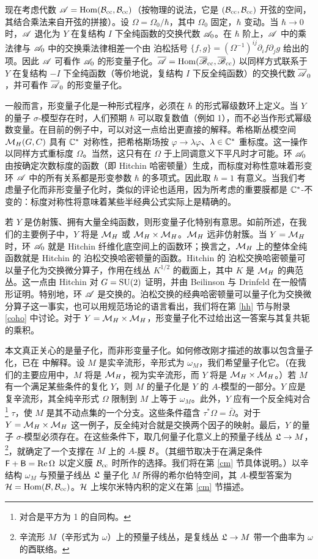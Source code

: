 现在考虑代数 ${\mathscr A}={\mathrm{Hom}}({\mathcal B}_{\mathrm{cc}},{\mathcal B}_{\mathrm{cc}})$（按物理的说法，它是 $({\mathcal B}_{\mathrm{cc}},{\mathcal B}_{\mathrm{cc}})$ 开弦的空间，其结合乘法来自开弦的拼接）。设 $\Omega=\Omega_0/\hbar$，其中 $\Omega_0$ 固定，$\hbar$ 变动。当 $\hbar\to 0$ 时，${\mathscr A}$ 退化为 $Y$ 在复结构 $I$ 下全纯函数的交换代数 ${\mathscr A}_0$。在 $\hbar$ 阶上，${\mathscr A}$ 中的乘法律与 ${\mathscr A}_0$ 中的交换乘法律相差一个由 泊松括号 $\{f,g\}=(\Omega^{-1})^{ij}\partial_i f\partial_j g$ 给出的项。因此 ${\mathscr A}$ 可看作 ${\mathscr A}_0$ 的形变量子化。$\overline{\mathscr A}={\mathrm{Hom}}({\overline {\mathscr B}}_{\mathrm{cc}},{\overline {\mathscr B}}_{\mathrm{cc}})$ 以同样方式联系于 $Y$ 在复结构 $-I$ 下全纯函数（等价地说，复结构 $I$ 下反全纯函数）的交换代数 $\overline{\mathscr A}_0$，并可看作 $\overline{\mathscr A}_0$ 的形变量子化。

一般而言，形变量子化是一种形式程序，必须在 $\hbar$ 的形式幂级数环上定义。当 $Y$ 的量子 $\sigma$-模型存在时，人们预期 $\hbar$ 可以取复数值（例如 1），而不必当作形式幂级数变量。在目前的例子中，可以对这一点给出更直接的解释。希格斯丛模空间 ${\mathcal M}_H(G,C)$ 具有 ${\mathbb C}^*$ 对称性，把希格斯场按 $\varphi\to \lambda\varphi$、$\lambda\in {\mathbb C}^*$ 重标度。这一操作以同样方式重标度 $\Omega$。当然，这只有在 $\Omega$ 于上同调意义下平凡时才可能。环 ${\mathscr A}_0$ 由按确定次数标度的函数（即 Hitchin 哈密顿量）生成，而标度对称性意味着形变环 ${\mathscr A}$ 中的所有关系都是形变参数 $\hbar$ 的多项式。因此取 $\hbar=1$ 有意义。当我们考虑量子化而非形变量子化时，类似的评论也适用，因为所考虑的重要膜都是 ${\mathbb C}^*$-不变的：标度对称性将意味着某些半经典公式实际上是精确的。

若 $Y$ 是仿射簇、拥有大量全纯函数，则形变量子化特别有意思。如前所述，在我们的主要例子中，$Y$ 将是 ${\mathcal M}_H$ 或 ${\mathcal M}_H\times {\mathcal M}_H$。${\mathcal M}_H$ 远非仿射簇。当 $Y={\mathcal M}_H$ 时，环 ${\mathscr A}_0$ 就是 Hitchin 纤维化底空间上的函数环；换言之，${\mathcal M}_H$ 上的整体全纯函数就是 Hitchin 的 泊松交换哈密顿量的函数。Hitchin 的 泊松交换哈密顿量可以量子化为交换微分算子，作用在线丛 $K^{1/2}$ 的截面上，其中 $K$ 是 ${\mathcal M}_H$ 的典范丛。这一点由 Hitchin \cite{H2} 对 $G={\mathrm{SU}}(2)$ 证明，并由 Beilinson 与 Drinfeld \cite{BD} 在一般情形证明。特别地，环 ${\mathscr A}$ 是交换的。泊松交换的经典哈密顿量可以量子化为交换微分算子这一事实，也可以用规范场论的语言看出，我们将在第 \ref{hh} 节与附录 \ref{coho} 中讨论。对于 $Y={\mathcal M}_H\times{\mathcal M}_H$，形变量子化不过给出这一答案与其复共轭的乘积。

本文真正关心的是量子化，而非形变量子化。如何修改刚才描述的故事以包含量子化，已在 \cite{GuW,GW} 中解释。设 $M$ 是实辛流形，辛形式为 $\omega_M$，我们希望量子化它。（在我们的主要应用中，$M$ 将是 ${\mathcal M}_H$，视为实辛流形，而 $Y$ 将是 ${\mathcal M}_H\times {\mathcal M}_H$。）若 $M$ 有一个满足某些条件的复化 $Y$，则 $M$ 的量子化是 $Y$ 的 $A$-模型的一部分。$Y$ 应是复辛流形，其全纯辛形式 $\Omega$ 限制到 $M$ 上等于 $\omega_M$。此外，$Y$ 应有一个反全纯对合\footnote{对合是平方为 1 的自同构。} $\tau$，使 $M$ 是其不动点集的一个分支。这些条件蕴含 $\tau^*\Omega=\bar\Omega$。对于 $Y={\mathcal M}_H\times {\mathcal M}_H$ 这一例子，反全纯对合就是交换两个因子的映射。最后，$Y$ 的量子 $\sigma$-模型必须存在。在这些条件下，取几何量子化意义上的预量子线丛 ${{{\mathfrak L}}}\to M$，\footnote{辛流形 $M$（辛形式为 $\omega$）上的预量子线丛，是复线丛 ${{\mathfrak L}}\to M$ 带一个曲率为 $\omega$ 的酉联络。}，就确定了一个支撑在 $M$ 上的 $A$-膜 ${\mathcal B}$。（其细节取决于在满足条件 ${\sf F}+{\sf B}={\mathrm{Re}}\,\Omega$ 以定义膜 ${\mathcal B}_{\mathrm{cc}}$ 时所作的选择。我们将在第 \ref{cm} 节具体说明。）以辛结构 $\omega_M$ 与预量子线丛 ${{\mathfrak L}}$ 量子化 $M$ 所得的希尔伯特空间，其 $A$-模型答案为 ${\mathcal H}={\mathrm{Hom}}({\mathcal B},{\mathcal B}_{\mathrm{cc}})$。${\mathcal H}$ 上埃尔米特内积的定义在第 \ref{cm} 节描述。

